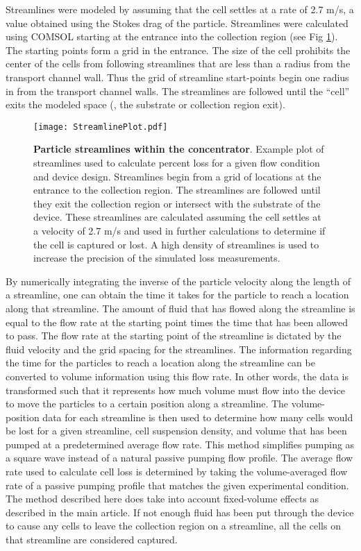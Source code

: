 Streamlines were modeled by assuming that the cell settles at a rate of 2.7 \textmu m/s, a value obtained using the Stokes drag of the particle. Streamlines were calculated using COMSOL starting at the entrance into the collection region (see Fig \ref{fig:streamlines}). The starting points form a grid in the entrance. The size of the cell prohibits the center of the cells from following streamlines that are less than a radius from the transport channel wall. Thus the grid of streamline start-points begin one radius in from the transport channel walls. The streamlines are followed until the ``cell'' exits the modeled space (\ie , the substrate or collection region exit).

\begin{figure}[!t]
\centering
\texttt{[image: StreamlinePlot.pdf]}
\caption{\textbf{Particle streamlines within the concentrator}. Example plot of streamlines used to calculate percent loss for a given flow condition and device design. Streamlines begin from a grid of locations at the entrance to the collection region. The streamlines are followed until they exit the collection region or intersect with the substrate of the device. These streamlines are calculated assuming the cell settles at a velocity of 2.7 \textmu m/s and used in further calculations to determine if the cell is captured or lost. A high density of streamlines is used to increase the precision of the simulated loss measurements.}
\label{fig:streamlines}
\end{figure}

By numerically integrating the inverse of the particle velocity along the length of a streamline, one can obtain the time it takes for the particle to reach a location along that streamline. The amount of fluid that has flowed along the streamline is equal to the flow rate at the starting point times the time that has been allowed to pass. The flow rate at the starting point of the streamline is dictated by the fluid velocity and the grid spacing for the streamlines. The information regarding the time for the particles to reach a location along the streamline can be converted to volume information using this flow rate. In other words, the data is transformed such that it represents how much volume must flow into the device to move the particles to a certain position along a streamline. The volume-position data for each streamline is then used to determine how many cells would be lost for a given streamline, cell suspension density, and volume that has been pumped at a predetermined average flow rate. This method simplifies pumping as a square wave instead of a natural passive pumping flow profile. The average flow rate used to calculate cell loss is determined by taking the volume-averaged flow rate of a passive pumping profile that matches the given experimental condition. The method described here does take into account fixed-volume effects as described in the main article. If not enough fluid has been put through the device to cause any cells to leave the collection region on a streamline, all the cells on that streamline are considered captured.

